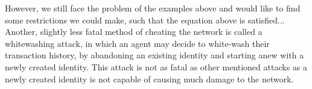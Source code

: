 \documentclass[11pt,a4paper]{article}
\theoremstyle{definition}
\theoremstyle{theorem}
\theoremstyle{proposition}
\theoremstyle{corollary}
\theoremstyle{lemma}
\theoremstyle{example}
\theoremstyle{remark}
\begin{document}
\noindent{}However, we still face the problem of the examples above and would like to find some restrictions we could make, such that the equation above is satisfied... \vspace{1em}\\ 



\noindent{}Another, slightly less fatal method of cheating the network is called a whitewashing attack, in which an agent may decide to white-wash their transaction history, by abandoning an existing identity and starting anew with a newly created identity. This attack is not as fatal as other mentioned attacks as a newly created identity is not capable of causing much damage to the network.\vspace{1em}\\
\end{document}
